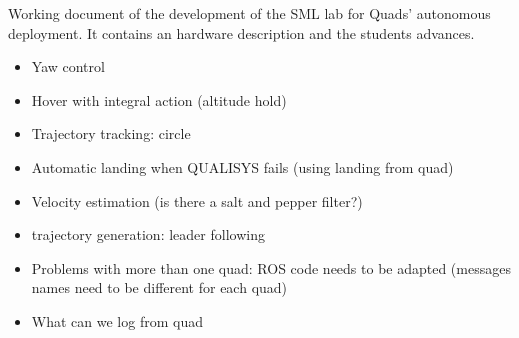 Working document of the development of the SML lab for Quads' autonomous deployment. 
%
It contains an hardware description and the students advances.

\vspace{1cm}	


\begin{itemize}
	
	\item Yaw control
	
	\item Hover with integral action (altitude hold)
	
	\item Trajectory tracking: circle
	
	\item Automatic landing when QUALISYS fails (using landing from quad)
	
	\item Velocity estimation (is there a salt and pepper filter?)
	
	\item trajectory generation: leader following
	
	\item Problems with more than one quad: ROS code needs to be adapted (messages names need to be different for each quad)
	
	\item What can we log from quad
	
\end{itemize}

